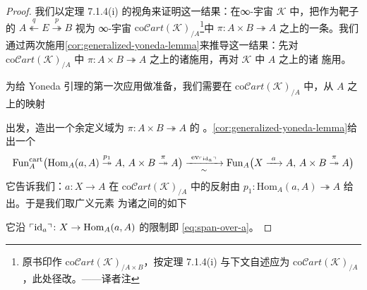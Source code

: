 \begin{proof}
我们以定理 7.1.4(i) 的视角来证明这一结果：在∞-宇宙 $\mathcal{K}$ 中，把作为靶子
的\trTwoSidedFibration{}
$A\overset{q}{\twoheadleftarrow}E\overset{p}{\twoheadrightarrow}B$ 视为
∞-宇宙 $\mathrm{co}\mathcal{C}\mathit{art}(\mathcal{K})_{/A}$\footnote{原书印作 $\mathrm{co}\mathcal{C}\mathit{art}(\mathcal{K})_{/A\times B}$，按定理 7.1.4(i) 与下文自述应为 $\mathrm{co}\mathcal{C}\mathit{art}(\mathcal{K})_{/A}$，此处径改。——译者注}中
$\pi\colon A\times B\twoheadrightarrow A$ 之上的一条\trCartesianFibration{}。我们
通过两次施用\cref{cor:generalized-yoneda-lemma}来推导这一结果：先对
$\mathrm{co}\mathcal{C}\mathit{art}(\mathcal{K})_{/A}$ 中 $\pi\colon A\times B\twoheadrightarrow A$
之上的诸\trCartesianFibration{}施用，再对 $\mathcal{K}$ 中 $A$ 之上的诸%
\trCocartesianFibration{}施用。

为给 Yoneda 引理的第一次应用做准备，我们需要在 $\mathrm{co}\mathcal{C}\mathit{art}(\mathcal{K})_{/A}$
中，从 $A$ 之上的映射
\begin{rveq}\label{eq:span-over-a}
\end{rveq}
出发，造出一个余定义域为 $\pi\colon A\times B\twoheadrightarrow A$ 的%
\trGeneralizedElement{}。\cref{cor:generalized-yoneda-lemma}给出一个\trEquivalence
\[
\mathrm{Fun}_{A}^{\mathrm{cart}}\bigl(
\mathrm{Hom}_{A}(a,A)\mathrel{\overset{p_{1}}{\twoheadrightarrow}}A,\,
A\times B\mathrel{\overset{\pi}{\twoheadrightarrow}}A
\bigr)
\xrightarrow[\ \sim\ ]{\ \mathrm{ev}_{\ulcorner\mathrm{id}_{a}\urcorner}\ }
\mathrm{Fun}_{A}\bigl(
X\xrightarrow{\ a\ }A,\,
A\times B\mathrel{\overset{\pi}{\twoheadrightarrow}}A
\bigr)
\]
它告诉我们：$a\colon X\to A$ 在 $\mathrm{co}\mathcal{C}\mathit{art}(\mathcal{K})_{/A}$ 中的反射由
$p_{1}\colon\mathrm{Hom}_{A}(a,A)\twoheadrightarrow A$ 给出。于是我们取广义元素
为诸\trCocartesianFibration{}之间的如下\trCartesianFunctor
\begin{rveq}\label{eq:cartesian-functor-pair}
\end{rveq}
它沿 $\ulcorner\mathrm{id}_{a}\urcorner\colon X\to\mathrm{Hom}_{A}(a,A)$ 的限制即
\eqref{eq:span-over-a}。


\end{proof}
